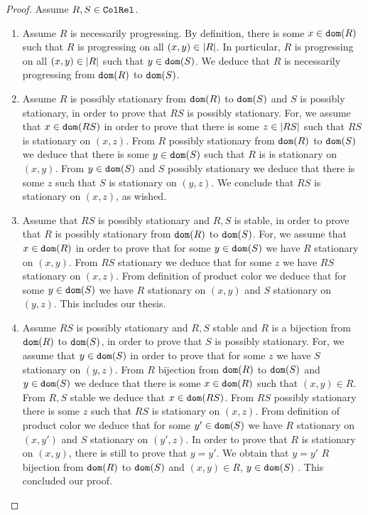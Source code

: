 \documentclass{lmcs}
\begin{document}
\begin{proof}
Assume $R, S \in {\tt ColRel}$.

\begin{enumerate}
\item
Assume $R$ is necessarily progressing. By definition, 
there is some $x \in {\tt dom}(R)$ such that $R$ is progressing on all $(x,y) \in {| R |}$. 
In particular, $R$ is progressing on all  $(x,y) \in {| R |}$ such that $y \in {\tt dom}(S)$. 
We deduce that $R$ is necessarily progressing from ${\tt dom}(R)$ to ${\tt dom}(S)$. 

\item
Assume $R$ is possibly stationary from ${\tt dom}(R)$ to ${\tt dom}(S)$ and $S$ is possibly stationary,
in order to prove that $RS$ is possibly stationary. For, we assume that $x \in {\tt dom}(RS)$
in order to prove that there is some $z \in {| RS |}$ such that $RS$ is stationary on
$(x,z)$. From $R$ possibly stationary from ${\tt dom}(R)$ to ${\tt dom}(S)$ we deduce that
there is some $y \in {\tt dom}(S)$ such that $R$ is  is stationary on $(x,y)$. From $y \in {\tt dom}(S)$
and $S$ possibly stationary we deduce that there is some $z$ such that $S$ is stationary on
$(y,z)$. We conclude that $RS$ is stationary on $(x,z)$, as wished.

\item
Assume that $RS$ is possibly stationary and $R,S$ is stable, in order to prove that 
$R$ is possibly stationary from ${\tt dom}(R)$ to ${\tt dom}(S)$. For, we assume that $x \in {\tt dom}(R)$ 
in order to prove that for some $y \in {\tt dom}(S)$ we have $R$ stationary on $(x,y)$. From 
$RS$ stationary we deduce that for some $z$ we have $RS$ stationary on $(x,z)$.
From definition of product color we deduce that for some $y \in {\tt dom}(S)$ we have 
$R$ stationary on $(x,y)$ and $S$ stationary on $(y,z)$. This includes our thesis. 

\item
Assume $RS$ is possibly stationary and $R,S$ stable and
$R$ is a bijection from ${\tt dom}(R)$ to ${\tt dom}(S)$,
in order to prove that $S$ is possibly stationary. For, we assume that $y \in {\tt dom}(S)$
in order to prove that for some $z$ we have $S$ stationary on $(y,z)$. From $R$ bijection from 
${\tt dom}(R)$ to ${\tt dom}(S)$ and $y \in {\tt dom}(S)$ we deduce that there is some $x \in {\tt dom}(R)$
such that $(x,y) \in R$. From $R,S$ stable we deduce that $x \in {\tt dom}(RS)$. From $RS$
possibly stationary there is some $z$ such that $RS$ is stationary on $(x,z)$. 
From definition of product color we deduce that for some $y' \in {\tt dom}(S)$ we have 
$R$ stationary on $(x,y')$ and $S$ stationary on $(y',z)$. In order to prove that $R$  is stationary 
on $(x,y)$, there is still to prove that $y=y'$. 
We obtain that $y=y'$ $R$ bijection from ${\tt dom}(R)$ to ${\tt dom}(S)$ and $(x,y) \in R$,
$y \in {\tt dom}(S)$ . This concluded our proof. 


\end{enumerate}
\end{proof}
\end{document}
